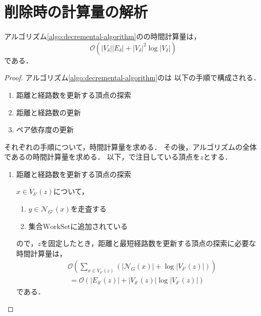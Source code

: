 \section{削除時の計算量の解析}
\label{subsect:computational-complexity-of-decremental-algorithm}

\begin{lemma}
  アルゴリズム\ref{algo:decremental-algorithm}のの時間計算量は，
  \[ \mathcal{O}(\lvert V_\delta\rvert\lvert E_\delta\rvert
  +\lvert V_\delta\rvert^2\log \lvert V_\delta\rvert) \]
  である．
\end{lemma}
\begin{proof}
  アルゴリズム\ref{algo:decremental-algorithm}のは
  以下の手順で構成される．
  \begin{enumerate}[label=(\alph*)]
  \item 距離と経路数を更新する頂点の探索
  \item 距離と経路数の更新
  \item ペア依存度の更新
  \end{enumerate}
  それぞれの手順について，時間計算量を求める．
  その後，アルゴリズムの全体であるの時間計算量を求める．
  以下，で注目している頂点を$z$とする．

  \begin{enumerate}[label=(\alph*)]
  \item 距離と経路数を更新する頂点の探索
    \par $x\in V_{\delta'}(z)$について，
    \begin{enumerate}[label=\arabic*.]
    \item $y\in\mathcal{N}_{G'}(x)$を走査する
    \item 集合$\text{WorkSet}$に追加されている
    \end{enumerate}
    ので，$z$を固定したとき，距離と最短経路数を更新する頂点の探索に必要な時間計算量は，
    \begin{equation}
      \begin{aligned}
        &\mathcal{O}(\sum_{x\in V_{\delta'}(z)}(\lvert\mathcal{N}_G(x)\rvert
        +\log\lvert V_{\delta'}(z)\rvert)) \nonumber\\
        &\:=\mathcal{O}(\lvert E_{\delta'}(z)\rvert
        +\lvert V_{\delta'}(z)\rvert\log\lvert V_{\delta'}(z)\rvert) \nonumber
      \end{aligned}
    \end{equation}
    である．


\end{enumerate}
\end{proof}
